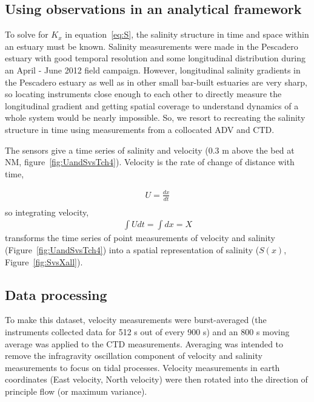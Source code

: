 \subsection{Using observations in an analytical framework} \label{ssec:ObsInto1DAdvDiff}
To solve for $K_x$ in equation~\ref{eq:S}, the salinity structure in time and space within an estuary must be known. Salinity measurements were made in the Pescadero estuary with good temporal resolution and some longitudinal distribution during an April - June 2012 field campaign. However, longitudinal salinity gradients in the Pescadero estuary as well as in other small bar-built estuaries are very sharp, so locating instruments close enough to each other to directly measure the longitudinal gradient and getting spatial coverage to understand dynamics of a whole system would be nearly impossible. So, we resort to recreating the salinity structure in time using measurements from a collocated ADV and CTD. 

The sensors give a time series of salinity and velocity (0.3 m above the bed at NM, figure~\ref{fig:UandSvsTch4}). Velocity is the rate of change of distance with time,

\begin{eqnarray}
U = \frac{dx}{dt} \label{eq:uEdxdt}\\
\end{eqnarray}
so integrating velocity,
\begin{eqnarray}
\int{Udt} = \int{dx} = X \label{eq:intuEx}
\end{eqnarray}
transforms the time series of point measurements of velocity and salinity (Figure~\ref{fig:UandSvsTch4}) into a spatial representation of salinity ($S(x)$, Figure~\ref{fig:SvsXall}).

\subsection{Data processing} \label{ssec:DataProcessing}
To make this dataset, velocity measurements were burst-averaged (the instruments collected data for 512 s out of every 900 s) and an 800 s moving average was applied to the CTD measurements.  Averaging was intended to remove the infragravity oscillation component of velocity and salinity measurements to focus on tidal processes. Velocity measurements in earth coordinates (East velocity, North velocity) were then rotated into the direction of principle flow (or maximum variance). 

